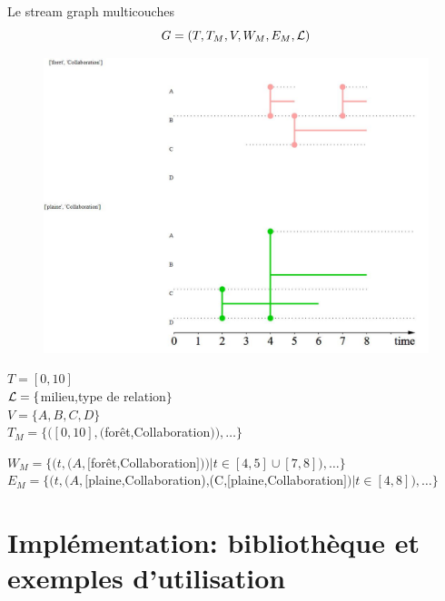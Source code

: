 \documentclass[15pt]{beamer}
\def \stgm {stream graph multicouches}
\begin{document}
\begin{frame}{Le \stgm{}}
	\[
		G=(T,T_M,V,W_M,E_M,\cal{L})
	\]
	\begin{minipage}{0.59\linewidth}
		\begin{figure}
    		\centering
    		\includegraphics[width=\linewidth]{img/exMultiStream.JPG}
		\end{figure}
	\end{minipage}
	\begin{minipage}{0.4\textwidth}
		\begin{footnotesize}
			$T=[0,10]$\\ \pause
			${\cal L} = \{$milieu,type de relation$\}$\\ \pause
			$V=\{A,B,C,D\}$\\ \pause
			$T_M= \{([0,10],($forêt,Collaboration$)), \dots \}$\pause
		\end{footnotesize}
	\end{minipage}

	\begin{footnotesize}
		$W_M = \{ (t,(A,[$forêt,Collaboration$]))| t \in [4,5]\cup[7,8]), \dots \}$ \pause
		\\
		$E_M= \{ (t,(A,[$plaine,Collaboration),(C,[plaine,Collaboration$])| t \in [4,8]), \dots \}$
	\end{footnotesize}
\end{frame}

\section{Implémentation: bibliothèque et exemples d'utilisation}
\end{document}
